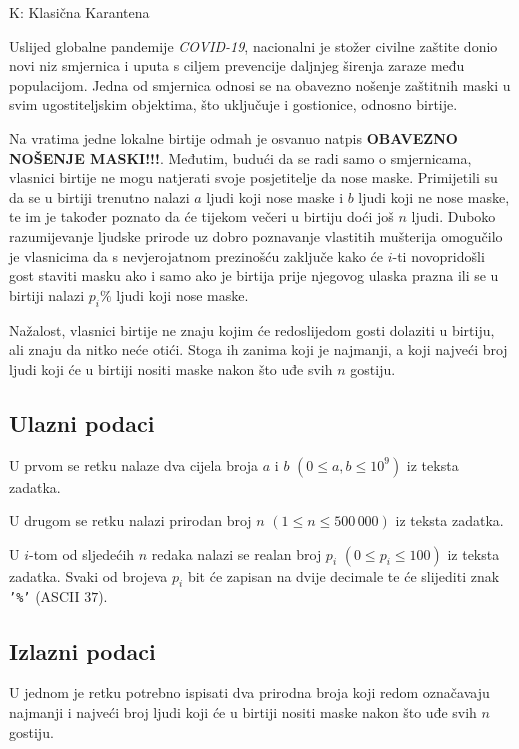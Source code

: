 \begin{statement}[
  timelimit=1 s,
  memorylimit=512 MiB,
]{K: Klasična Karantena}

Uslijed globalne pandemije \textit{COVID-19}, nacionalni je stožer civilne
zaštite donio novi niz smjernica i uputa s ciljem prevencije daljnjeg širenja
zaraze među populacijom. Jedna od smjernica odnosi se na obavezno nošenje
zaštitnih maski u svim ugostiteljskim objektima, što uključuje i gostionice,
odnosno birtije.

Na vratima jedne lokalne birtije odmah je osvanuo natpis \textbf{OBAVEZNO
NOŠENJE MASKI!!!}. Međutim, budući da se radi samo o smjernicama, vlasnici
birtije ne mogu natjerati svoje posjetitelje da nose maske. Primijetili su da
se u birtiji trenutno nalazi $a$ ljudi koji nose maske i $b$ ljudi koji ne
nose maske, te im je također poznato da će tijekom večeri u birtiju doći još
$n$ ljudi. Duboko razumijevanje ljudske prirode uz dobro poznavanje vlastitih
mušterija omogučilo je vlasnicima da s nevjerojatnom prezinošću zaključe kako
će $i$-ti novopridošli gost staviti masku ako i samo ako je birtija prije
njegovog ulaska prazna ili se u birtiji nalazi $p_i\%$ ljudi koji nose maske.

Nažalost, vlasnici birtije ne znaju kojim će redoslijedom gosti dolaziti u
birtiju, ali znaju da nitko neće otići. Stoga ih zanima koji je najmanji,
a koji najveći broj ljudi koji će u birtiji nositi maske nakon što uđe svih
$n$ gostiju.

\subsection*{Ulazni podaci}
U prvom se retku nalaze dva cijela broja $a$ i $b$ $(0 \le a, b \le 10^9)$ iz
teksta zadatka.

U drugom se retku nalazi prirodan broj $n$ $(1 \le n \le 500\,000)$ iz teksta
zadatka.

U $i$-tom od sljedećih $n$ redaka nalazi se realan broj $p_i$ $(0 \le p_i \le
100)$ iz teksta zadatka. Svaki od brojeva $p_i$ bit će zapisan na dvije
decimale te će slijediti znak \texttt{'\%'} (ASCII $37$).

\subsection*{Izlazni podaci}
U jednom je retku potrebno ispisati dva prirodna broja koji redom označavaju
najmanji i najveći broj ljudi koji će u birtiji nositi maske nakon što uđe
svih $n$ gostiju.


\end{statement}
